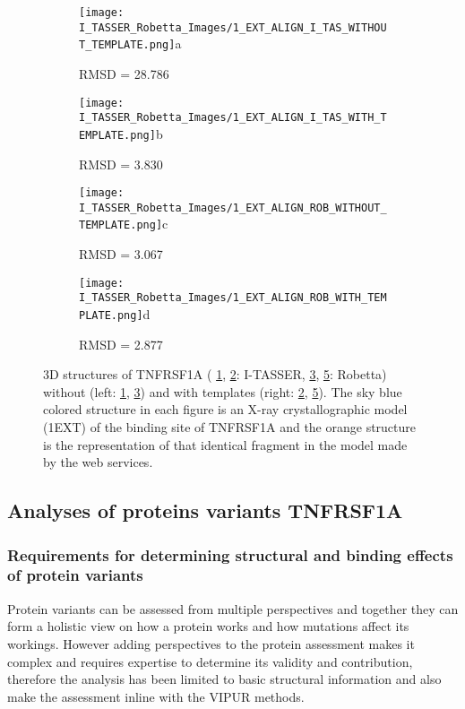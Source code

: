 	\begin{figure}[!ht]
		\centering
		\begin{subfigure}{0.45\textwidth}
			\texttt{[image: I\_TASSER\_Robetta\_Images/1\_EXT\_ALIGN\_I\_TAS\_WITHOUT\_TEMPLATE.png]}{a}
			\caption{RMSD = 28.786}
			\label{fig:RES_I_TASSER_Without}
		\end{subfigure}
		\begin{subfigure}{0.45\textwidth}
			\texttt{[image: I\_TASSER\_Robetta\_Images/1\_EXT\_ALIGN\_I\_TAS\_WITH\_TEMPLATE.png]}{b}
			\caption{RMSD =  3.830}
			\label{fig:RES_I_TASSER_With}
		\end{subfigure}
		\begin{subfigure}{0.45\textwidth}
			\texttt{[image: I\_TASSER\_Robetta\_Images/1\_EXT\_ALIGN\_ROB\_WITHOUT\_TEMPLATE.png]}{c}
			\caption{RMSD =  3.067}
			\label{fig:RES_Robetta_Without}
		\end{subfigure}
		\begin{subfigure}{0.45\textwidth}
			\texttt{[image: I\_TASSER\_Robetta\_Images/1\_EXT\_ALIGN\_ROB\_WITH\_TEMPLATE.png]}{d}
			\caption{RMSD =  2.877}
			\label{fig:RES_Robetta_With}
		\end{subfigure}
		\caption[I-TASSER and Robetta models with and without templates]{3D structures of TNFRSF1A ( \ref{fig:RES_I_TASSER_Without}, \ref{fig:RES_I_TASSER_With}: I-TASSER, \ref{fig:RES_Robetta_Without}, \ref{fig:RES_Robetta_With}: Robetta) without (left: \ref{fig:RES_I_TASSER_Without}, \ref{fig:RES_Robetta_Without}) and with templates (right: \ref{fig:RES_I_TASSER_With}, \ref{fig:RES_Robetta_With}). The sky blue colored structure in each figure is an X-ray crystallographic model (1EXT) of the binding site of TNFRSF1A and the orange structure is the representation of that identical fragment in the model made by the web services.}
	\end{figure}
	\label{subsubsec:RES_Expanding_Models}

\newpage
\subsection{Analyses of proteins variants TNFRSF1A}
	\subsubsection{Requirements for determining structural and binding effects of protein variants}
	Protein variants can be assessed from multiple perspectives and together they can form a holistic view on how a protein works and how mutations affect its workings. However adding perspectives to the protein assessment makes it complex and requires expertise to determine its validity and contribution, therefore the analysis has been limited to basic structural information and also make the assessment inline with the VIPUR methods.
	
